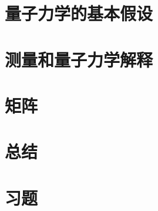 \section{量子力学的基本假设}
\label{sec:7.8 The Postulates of Quantum Mechanics}

\section{测量和量子力学解释}
\label{sec:7.9 Measurement and the Interpretation of Quantum Mechanics}

\section{矩阵}
\label{sec:7.10 Matrices}

\section*{总结}

\section*{习题}